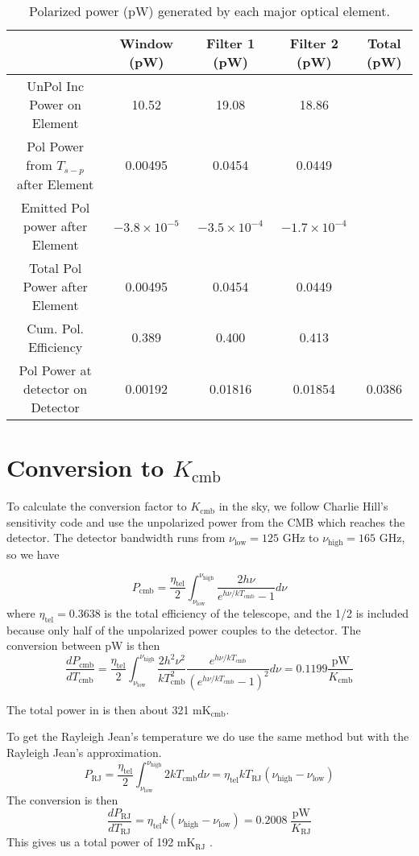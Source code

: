 \documentclass{article}
\theoremstyle{remark}
\newcommand{\td}[2]{\frac{d#1}{d#2}}
\renewcommand{\t}[1]{\text{#1}}
\begin{document}
\begin{table}
	\centering
	\begin{tabular}{| c | c | c | c | c |}
		\hline
		                      			& Window (pW) & Filter 1 (pW) & Filter 2 (pW) & Total (pW)\\ \hline
		UnPol Inc Power on Element          & 10.52 &    19.08      &   18.86       & \\
		Pol Power from $T_{s-p}$ after Element  	 	&  0.00495 &   0.0454       &    0.0449      & \\
		Emitted Pol power after Element    &  $-3.8\times10^{-5} $ &    $-3.5 \times 10^{-4} $  & $-1.7 \times 10^{-4}   $    & \\
		Total Pol Power after Element  	     &  0.00495  &  0.0454   &  0.0449       & \\
		Cum. Pol. Efficiency & 0.389 & 0.400 & 0.413 & \\
		Pol Power at detector on Detector& 0.00192  &  0.01816   & 0.01854& 0.0386 \\
		\hline
	\end{tabular}
\caption{Polarized power (pW) generated by each major optical element. }
\label{tab:opt_power}
\end{table}

\section{Conversion to $K_\text{cmb}$}

To calculate  the conversion factor to $K_\text{cmb}$ in the sky, we follow Charlie Hill's sensitivity code and use the unpolarized power from the CMB which reaches the detector.
The detector bandwidth runs from $\nu_{\t{low}} =  125$ GHz to $\nu_{\t{high}}=165$ GHz, so we have

\[P_\text{cmb} = 
\frac{\eta_\t{tel}}{2} \int_{\nu_{\t{low}}}^{\nu_{\t{high}}} 
\frac{2 h \nu}{e^{h \nu/k T_\t{cmb}} - 1} d \nu
\]
where $\eta_\t{tel} = 0.3638$ is the total efficiency of the telescope, and the 1/2 is included because only half of the unpolarized power couples to the detector.
The conversion between pW is then 
\[
\td{P_\t{cmb}}{T_\t{cmb}} =
\frac{\eta_\t{tel}}{2} \int_{\nu_{\t{low}}}^{\nu_{\t{high}}} 
\frac{2 h^2 \nu^2}{ k T_\t{cmb}^2 } 
\frac{e^{h \nu/k T_\t{cmb}}}{\left(e^{h \nu/k T_\t{cmb}} - 1 \right)^2} d \nu 
= 0.1199 \frac{\t{pW}}{K_\t{cmb}}
\]

The total power in is then about 321 mK$_\t{cmb}$.

To get the Rayleigh Jean's temperature we do use the same method but with the Rayleigh Jean's approximation. 
\[P_\text{RJ} = 
\frac{\eta_\t{tel}}{2} \int_{\nu_{\t{low}}}^{\nu_{\t{high}}} 
2 k T_\t{cmb} d \nu = 
\eta_\t{tel} k T_\t{RJ} (\nu_{\t{high}} - \nu_{\t{low}})
\]
The conversion is then 
\[
\td{P_\t{RJ}}{T_\t{RJ}} = \eta_\t{tel} k  (\nu_{\t{high}} - \nu_{\t{low}}) = 0.2008\; \frac{\t{pW}}{K_\t{RJ}}
\]
This gives us a total power of 192 mK$_\t{RJ}$ .
\end{document}
